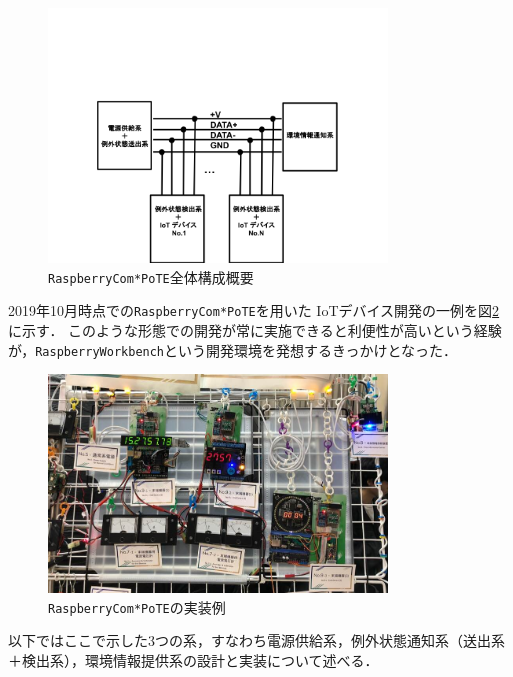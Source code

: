 \vspace*{-5zh}
\begin{figure}[h]
\centering%
\includegraphics[width=9cm]{figspics/RaspberryComPoTE_figX2.png}
\caption{{\tt Raspberry\-Com*PoTE}全体構成概要}
\label{RaspberryComPoTE-X1}
\end{figure}
\vspace*{-1zh}


2019年10月時点での{\tt Raspberry\-Com*PoTE}を用いた IoTデバイス開発の一例を図\ref{RaspberryComPoTE-X2}に示す．
このような形態での開発が常に実施できると利便性が高いという経験が，{\tt Raspberry\-Workbench}という開発環境を発想するきっかけとなった．

\begin{figure}[h]
\centering
\includegraphics[width=9cm]{figspics/RaspberryWorkbench3.png}
\caption{{\tt Raspberry\-Com*PoTE}の実装例}
\label{RaspberryComPoTE-X2}
\end{figure}

以下ではここで示した3つの系，すなわち電源供給系，例外状態通知系（送出系＋検出系），環境情報提供系の設計と実装について述べる．

